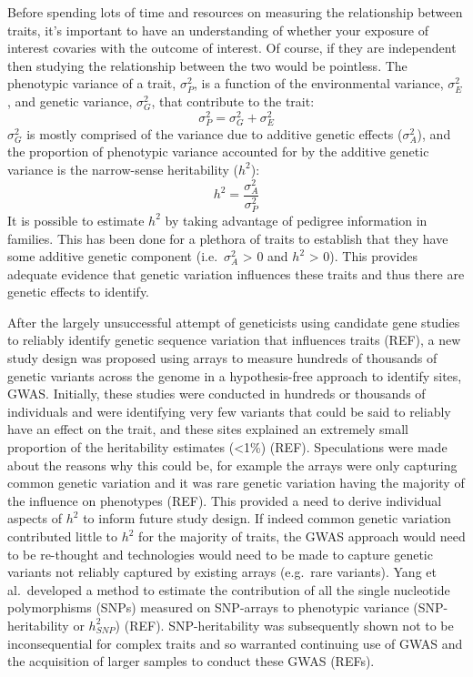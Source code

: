 \documentclass[11pt,twoside]{bristolthesis}
\begin{document}
Before spending lots of time and resources on measuring the relationship between traits, it's important to have an understanding of whether your exposure of interest covaries with the outcome of interest. Of course, if they are independent then studying the relationship between the two would be pointless. The phenotypic variance of a trait, \(\sigma^2_{P}\), is a function of the environmental variance, \(\sigma^2_{E}\), and genetic variance, \(\sigma^2_{G}\), that contribute to the trait:
\begin{equation}
    \sigma^2_{P} = \sigma^2_{G} + \sigma^2_{E}
    \label{eq:phenotypic-variance}
\end{equation}
\(\sigma^2_{G}\) is mostly comprised of the variance due to additive genetic effects (\(\sigma^2_{A}\)), and the proportion of phenotypic variance accounted for by the additive genetic variance is the narrow-sense heritability (\(h^2\)):
\begin{equation}
    h^2 = \frac{\sigma^2_{A}} {\sigma^2_{P}}
    \label{eq:narrow-sense-heritability}
\end{equation}
It is possible to estimate \(h^2\) by taking advantage of pedigree information in families. This has been done for a plethora of traits to establish that they have some additive genetic component (i.e.~\(\sigma^2_{A}\) \textgreater{} 0 and \(h^2\) \textgreater{} 0). This provides adequate evidence that genetic variation influences these traits and thus there are genetic effects to identify.

After the largely unsuccessful attempt of geneticists using candidate gene studies to reliably identify genetic sequence variation that influences traits (REF), a new study design was proposed using arrays to measure hundreds of thousands of genetic variants across the genome in a hypothesis-free approach to identify sites, GWAS. Initially, these studies were conducted in hundreds or thousands of individuals and were identifying very few variants that could be said to reliably have an effect on the trait, and these sites explained an extremely small proportion of the heritability estimates (\textless1\%) (REF). Speculations were made about the reasons why this could be, for example the arrays were only capturing common genetic variation and it was rare genetic variation having the majority of the influence on phenotypes (REF). This provided a need to derive individual aspects of \(h^2\) to inform future study design. If indeed common genetic variation contributed little to \(h^2\) for the majority of traits, the GWAS approach would need to be re-thought and technologies would need to be made to capture genetic variants not reliably captured by existing arrays (e.g.~rare variants). Yang et al.~developed a method to estimate the contribution of all the single nucleotide polymorphisms (SNPs) measured on SNP-arrays to phenotypic variance (SNP-heritability or \(h^2_{SNP}\)) (REF). SNP-heritability was subsequently shown not to be inconsequential for complex traits and so warranted continuing use of GWAS and the acquisition of larger samples to conduct these GWAS (REFs).
\end{document}
